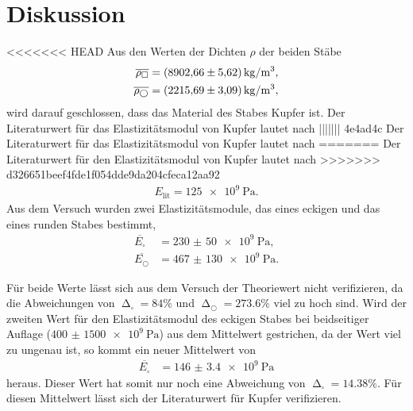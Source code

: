 \section{Diskussion}
\label{sec:Diskussion}

<<<<<<< HEAD
Aus den Werten der Dichten $\rho$ der beiden Stäbe
\begin{align*}
    \overline{\rho_\square} &= \SI{8902.66 (5.62)}{\kilo\gram\per\meter^3}, \\
    \overline{\rho_\bigcirc} &= \SI{2215.69 (3.09)}{\kilo\gram\per\meter^3},
\end{align*}
wird darauf geschlossen, dass das Material des Stabes Kupfer ist.
Der Literaturwert für das Elastizitätsmodul von Kupfer lautet nach \cite{czichos}
||||||| 4e4ad4c
Der Literaturwert für das Elastizitätsmodul von Kupfer lautet nach \cite{czichos}
=======
Der Literaturwert für den Elastizitätsmodul von Kupfer lautet nach \cite{czichos}
>>>>>>> d326651beef4fde1f054dde9da204cfeca12aa92
\begin{align*}
    E_{\text{lit}} = \SI{125e9}{\Pa}.
\end{align*}
Aus dem Versuch wurden zwei Elastizitätsmodule, das eines eckigen und das eines runden Stabes bestimmt,
\begin{align*}
    \overline{E_{\square}} &= \SI{230(50)e9}{\Pa}, \\
    \overline{E_{\bigcirc}} &= \SI{467(130)e9}{\Pa}.
\end{align*}

\sloppy
Für beide Werte lässt sich aus dem Versuch der Theoriewert nicht verifizieren, da die Abweichungen von
$\upDelta_{\square} = 84 \%$ und $\upDelta_{\bigcirc} = 273.6 \%$ viel zu hoch sind.
Wird der zweiten Wert für den Elastizitätsmodul des eckigen Stabes bei beidseitiger Auflage ($\SI{400(1500)e9}{\Pa}$)
aus dem Mittelwert gestrichen, da der Wert viel zu ungenau ist, so kommt ein neuer Mittelwert von
\begin{align*}
    \overline{E_{\square}} &= \SI{146(3.4)e9}{\Pa}
\end{align*}
heraus. Dieser Wert hat somit nur noch eine Abweichung von $\upDelta_{\square} = 14.38 \%$.
Für diesen Mittelwert lässt sich der Literaturwert für Kupfer verifizieren.

